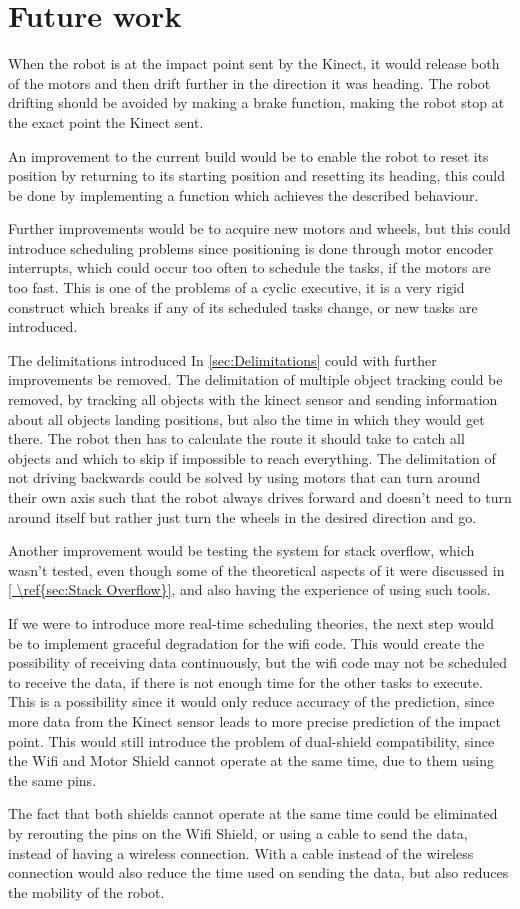 \chapter{Future work}
\label{chap:FutureWork}
When the robot is at the impact point sent by the Kinect, it would release both of the motors and then drift further in the direction it was heading. The robot drifting should be avoided by making a brake function, making the robot stop at the exact point the Kinect sent.

An improvement to the current build would be to enable the robot to reset its position by returning to its starting position and resetting its heading, this could be done by implementing a function which achieves the described behaviour.

Further improvements would be to acquire new motors and wheels, but this could introduce scheduling problems since positioning is done through motor encoder interrupts, which could occur too often to schedule the tasks, if the motors are too fast.
This is one of the problems of a cyclic executive, it is a very rigid construct which breaks if any of its scheduled tasks change, or new tasks are introduced.

The delimitations introduced In \ref{sec:Delimitations} could with further improvements be removed. The delimitation of multiple object tracking could be removed, by tracking all objects with the kinect sensor and sending information about all objects landing positions, but also the time in which they would get there. The robot then has to calculate the route it should take to catch all objects and which to skip if impossible to reach everything. The delimitation of not driving backwards could be solved by using motors that can turn around their own axis such that the robot always drives forward and doesn’t need to turn around itself but rather just turn the wheels in the desired direction and go.

Another improvement would be testing the system for stack overflow, which wasn't tested, even though some of the theoretical aspects of it were discussed in \ref{ \ref{sec:Stack Overflow}}, and also  having the experience of using such tools.

If we were to introduce more real-time scheduling theories, the next step would be to implement graceful degradation for the wifi code. This would create the possibility of receiving data continuously, but the wifi code may not be scheduled to receive the data, if there is not enough time for the other tasks to execute. This is a possibility since it would only reduce accuracy of the prediction, since more data from the Kinect sensor leads to more precise prediction of the impact point. This would still introduce the problem of dual-shield compatibility, since the Wifi and Motor Shield cannot operate at the same time, due to them using the same pins.

The fact that both shields cannot operate at the same time could be eliminated by rerouting the pins on the Wifi Shield, or using a cable to send the data, instead of having a wireless connection. With a cable instead of the wireless connection would also reduce the time used on sending the data, but also reduces the mobility of the robot.
